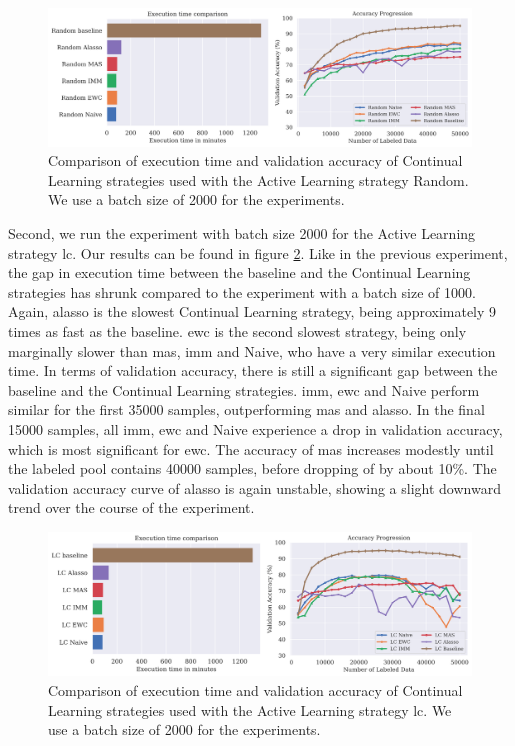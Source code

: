 \begin{figure}[h]
    \centering
    \includegraphics[width=\linewidth]{images/results_CAL/Random_CAL_2000b.png}
    \caption[Continual Active Learning Random 2000 batch size]{Comparison of execution time and validation accuracy of Continual Learning strategies used with the Active Learning strategy
    Random. We use a batch size of 2000 for the experiments.}
    \label{fig:Evaluation:Results:CAL:Random2000}
\end{figure}

Second, we run the experiment with batch size 2000 for the Active Learning strategy \gls{lc}. Our results can be found in figure \ref{fig:Evaluation:Results:CAL:LC2000}. Like in the previous experiment,
the gap in execution time between the baseline and the Continual Learning strategies has shrunk compared to the experiment with a batch size of 1000. Again, \gls{alasso} is the slowest Continual Learning
strategy, being approximately 9 times as fast as the baseline. \gls{ewc} is the second slowest strategy, being only marginally slower than \gls{mas}, \gls{imm} and Naive, who have a very similar execution time.
In terms of validation accuracy, there is still a significant gap between the baseline and the Continual Learning strategies. \gls{imm}, \gls{ewc} and Naive perform similar for the first 35000 samples, outperforming
\gls{mas} and \gls{alasso}. In the final 15000 samples, all \gls{imm}, \gls{ewc} and Naive experience a drop in validation accuracy, which is most significant for \gls{ewc}. The accuracy of \gls{mas} increases modestly until the labeled
pool contains 40000 samples, before dropping of by about 10\%. The validation accuracy curve of \gls{alasso} is again unstable, showing a slight downward trend over the course of the experiment. \par

\begin{figure}[h]
    \centering
    \includegraphics[width=\linewidth]{images/results_CAL/LC_CAL_2000b.png}
    \caption[Continual Active Learning \gls{lc} 2000 batch size]{Comparison of execution time and validation accuracy of Continual Learning strategies used with the Active Learning strategy
    \gls{lc}. We use a batch size of 2000 for the experiments.}
    \label{fig:Evaluation:Results:CAL:LC2000}
\end{figure}

